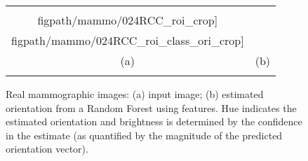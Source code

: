 
\begin{figure}[t]
\centering
\begin{tabular}{@{}c c@{}}
\texttt{[image: \\figpath/mammo/024RCC\_roi\_crop]} &
\texttt{[image: \\figpath/mammo/024RCC\_roi\_class\_ori\_crop]} \\
(a) & (b) \\
\noalign{\smallskip}
\end{tabular}
%
\caption{Real mammographic images: %
(a) input image; %
(b) estimated orientation from a Random Forest using \dtcwt{} features. Hue indicates the estimated orientation and brightness is determined by the confidence in the estimate (as quantified by the magnitude of the predicted orientation vector).}
\label{f:real_mammography}
\end{figure}
